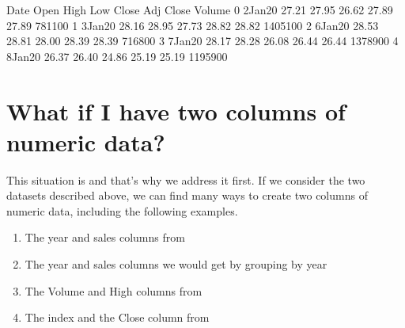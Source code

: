 \documentclass[letterpaper,10pt,english]{jupyterBook}
\begin{document}
\begin{sphinxVerbatim}[commandchars=\\\{\}]
    
\end{sphinxVerbatim}

\begin{sphinxVerbatim}[commandchars=\\\{\}]
       Date   Open   High    Low  Close  Adj Close   Volume
0  2\PYGZhy{}Jan\PYGZhy{}20  27.21  27.95  26.62  27.89      27.89   781100
1  3\PYGZhy{}Jan\PYGZhy{}20  28.16  28.95  27.73  28.82      28.82  1405100
2  6\PYGZhy{}Jan\PYGZhy{}20  28.53  28.81  28.00  28.39      28.39   716800
3  7\PYGZhy{}Jan\PYGZhy{}20  28.17  28.28  26.08  26.44      26.44  1378900
4  8\PYGZhy{}Jan\PYGZhy{}20  26.37  26.40  24.86  25.19      25.19  1195900
\end{sphinxVerbatim}


\section{What if I have two columns of numeric data?}
\label{\detokenize{chapter-10-visualization:what-if-i-have-two-columns-of-numeric-data}}
\sphinxAtStartPar
This situation is  and that’s why we address it first.  If we consider the two datasets described above, we can find many ways to create two columns of numeric data, including the following examples.
\begin{enumerate}
%
\item {} 
\sphinxAtStartPar
The year and sales columns from 

\item {} 
\sphinxAtStartPar
The year and sales columns we would get by grouping  by year

\item {} 
\sphinxAtStartPar
The Volume and High columns from 

\item {} 
\sphinxAtStartPar
The index and the Close column from 

\end{enumerate}
\end{document}
